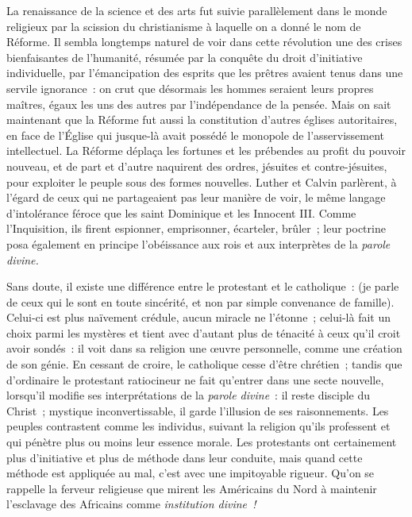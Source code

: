 \documentclass[french,twoside]{book} %
\begin{document}
 La renaissance de la science et des arts fut suivie parallèlement dans le monde religieux par la scission du christianisme à laquelle on a donné le nom de Réforme. Il sembla longtemps naturel de voir dans cette révolution une des crises bienfaisantes de l’humanité, résumée par la conquête du droit d’initiative individuelle, par l’émancipation des esprits que les prêtres avaient tenus dans une servile ignorance : on crut que désormais les hommes seraient leurs propres maîtres, égaux les uns des autres par l’indépendance de la pensée. Mais on sait maintenant que la Réforme fut aussi la constitution d’autres églises autoritaires, en face de l’Église qui jusque-là avait possédé le monopole de l’asservissement  intellectuel. La Réforme déplaça les fortunes et les prébendes au profit du pouvoir nouveau, et de part et d’autre naquirent des ordres, jésuites et contre-jésuites, pour exploiter le peuple sous des formes nouvelles. Luther et Calvin parlèrent, à l’égard de ceux qui ne partageaient pas leur manière de voir, le même langage d’intolérance féroce que les saint Dominique et les Innocent III. Comme l’Inquisition, ils firent espionner, emprisonner, écarteler, brûler ; leur poctrine posa également en principe l’obéissance aux rois et aux interprètes de la \emph{parole divine.}\par
Sans doute, il existe une différence entre le protestant et le catholique : (je parle de ceux qui le sont en toute sincérité, et non par simple convenance  de famille). Celui-ci est plus naïvement crédule, aucun miracle ne l’étonne ; celui-là fait un choix parmi les mystères et tient avec d’autant plus de ténacité à ceux qu’il croit avoir sondés : il voit dans sa religion une œuvre personnelle, comme une création de son génie. En cessant de croire, le catholique cesse d’être chrétien ; tandis que d’ordinaire le protestant ratiocineur ne fait qu’entrer dans une secte nouvelle, lorsqu’il modifie ses interprétations de la \emph{parole divine} : il reste disciple du Christ ; mystique inconvertissable, il garde l’illusion de ses raisonnements. Les peuples contrastent comme les individus, suivant la religion qu’ils professent et qui pénètre plus ou moins leur essence morale. Les protestants ont certainement plus d’initiative  et plus de méthode dans leur conduite, mais quand cette méthode est appliquée au mal, c’est avec une impitoyable rigueur. Qu’on se rappelle la ferveur religieuse que mirent les Américains du Nord à maintenir l’esclavage des Africains comme \emph{institution divine !}\par
\end{document}
